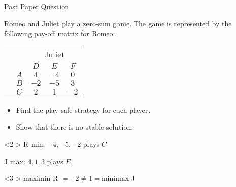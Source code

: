 \documentclass[8pt]{beamer}
\begin{document}
\begin{frame}{Past Paper Question}
	\begin{problem}
		Romeo and Juliet play a zero-sum game. The game is represented by the following pay-off matrix   for Romeo:


		\begin{center}
\colorbox{cc}{
	\setlength\arrayrulewidth{0.5mm}
\begin{tabular}{cc|ccc}
	\multicolumn{2}{c}{} & \multicolumn{3}{c}{Juliet}\\
\multicolumn{1}{c}{} &  & $D$  & $E$ & $F$ \\ \hline
\raisebox{0.0cm}{\multirow{3}*{\rotatebox{90}{Romeo}}}  & $A$ & $4$ & $-4$ & $0$ \\
& $B$ & $-2$ & $-5$ & $3$ \\
& $C$ & $2$ & $1$ & $-2$ \\
\end{tabular}}
\end{center}

\begin{itemize}
	\item Find the play-safe strategy for each player.
	\item Show that there is no stable solution.
\end{itemize}
	\end{problem}

	\begin{solution}<2->
		R min: $-4,-5,-2$ plays  $C$

		J max:  $4,1,3$ plays  $E$
	\end{solution}

	\begin{solution}<3->
		maximin R  $=-2\neq 1=$minimax J
	\end{solution}
\end{frame}
\end{document}
